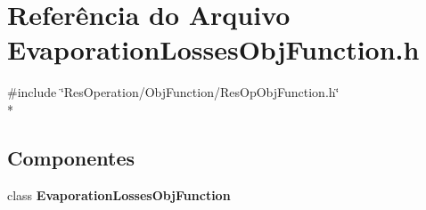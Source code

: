 \section{Referência do Arquivo Evaporation\+Losses\+Obj\+Function.\+h}
\label{_obj_function_2_evaporation_losses_2_evaporation_losses_obj_function_8h}
{\ttfamily \#include \char`\"{}Res\+Operation/\+Obj\+Function/\+Res\+Op\+Obj\+Function.\+h\char`\"{}}\\*
\subsection*{Componentes}
\begin{DoxyCompactItemize}
\item 
class {\bf Evaporation\+Losses\+Obj\+Function}
\end{DoxyCompactItemize}
